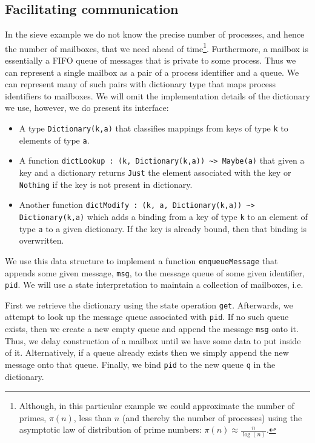 \documentclass[12pt,mscres,cdtppar,twoside,openright,logo,rightchapter,normalheadings]{infthesis}
\newcommand{\snippet}[1]{}
\theoremstyle{definition}
\begin{document}
\subsection{Facilitating communication}

In the sieve example we do not know the precise number of processes,
and hence the number of mailboxes, that we need ahead of
time\footnote{Although, in this particular example we could
  approximate the number of primes, $\pi(n)$, less than $n$ (and
  thereby the number of processes) using the asymptotic law of
  distribution of prime numbers: $\pi(n) \approx
  \frac{n}{\log(n)}$.}. Furthermore, a mailbox is essentially a FIFO
queue of messages that is private to some process. Thus we can
represent a single mailbox as a pair of a process identifier and a
queue. We can represent many of such pairs with dictionary type that
maps process identifiers to mailboxes. We will omit the implementation
details of the dictionary we use, however, we do present its
interface:
\begin{itemize}
\item A type \lstinline$Dictionary(k,a)$ that classifies mappings from
  keys of type \lstinline$k$ to elements of type \lstinline$a$.
\item A function
  \lstinline$dictLookup : (k, Dictionary(k,a)) ~> Maybe(a)$ that given
  a key and a dictionary returns \lstinline$Just$ the element
  associated with the key or \lstinline$Nothing$ if the key is not
  present in dictionary.
\item Another function
  \lstinline$dictModify : (k, a, Dictionary(k,a)) ~> Dictionary(k,a)$
  which adds a binding from a key of type \lstinline$k$ to an element
  of type \lstinline$a$ to a given dictionary. If the key is already
  bound, then that binding is overwritten.
\end{itemize}
We use this data structure to implement a function
\lstinline$enqueueMessage$ that appends some given message,
\lstinline$msg$, to the message queue of some given identifier,
\lstinline$pid$. We will use a state interpretation to maintain a
collection of mailboxes, i.e.
%
\snippet{enqueueMessage.links}
%
First we retrieve the dictionary using the state operation
\lstinline$get$. Afterwards, we attempt to look up the message queue
associated with \lstinline$pid$. If no such queue exists, then we
create a new empty queue and append the message \lstinline$msg$ onto
it. Thus, we delay construction of a mailbox until we have some data
to put inside of it. 
%
Alternatively, if a queue already exists then we simply append the new
message onto that queue. Finally, we bind \lstinline$pid$ to the new
queue \lstinline$q$ in the dictionary.
\end{document}
